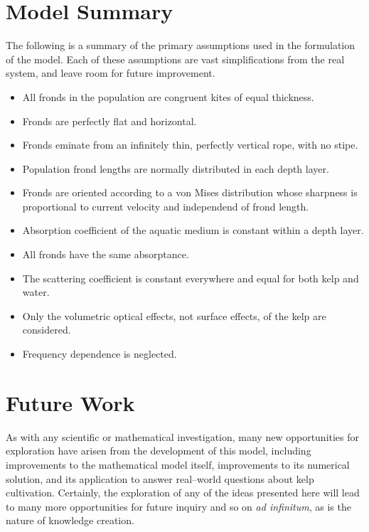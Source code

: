 \section{Model Summary}
The following is a summary of the primary assumptions used in the formulation of the model.
Each of these assumptions are vast simplifications from the real system, and leave room for future improvement.
\begin{itemize}
  \item All fronds in the population are congruent kites of equal thickness.
  \item Fronds are perfectly flat and horizontal.
  \item Fronds eminate from an infinitely thin, perfectly vertical rope, with no stipe.
  \item Population frond lengths are normally distributed in each depth layer.
  \item Fronds are oriented according to a von Mises distribution whose sharpness is proportional to current velocity and independend of frond length.
  \item Absorption coefficient of the aquatic medium is constant within a depth layer.
  \item All fronds have the same absorptance.
  \item The scattering coefficient is constant everywhere and equal for both kelp and water.
  \item Only the volumetric optical effects, not surface effects, of the kelp are considered.
  \item Frequency dependence is neglected.
\end{itemize}


\section{Future Work}
As with any scientific or mathematical investigation, many new opportunities for exploration have arisen from the development of this model, including improvements to the mathematical model itself, improvements to its numerical solution, and its application to answer real--world questions about kelp cultivation.
Certainly, the exploration of any of the ideas presented here will lead to many more opportunities for future inquiry and so on \textit{ad infinitum}, as is the nature of knowledge creation.
